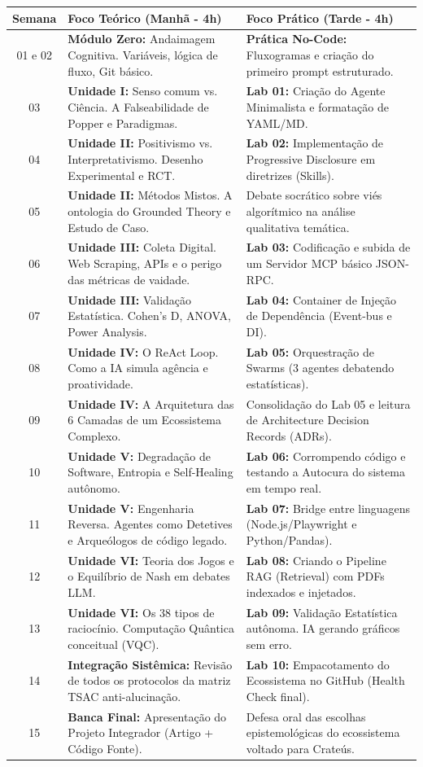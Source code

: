 \documentclass[12pt,a4paper]{article}
\begin{document}
\begin{tabularx}{\textwidth}{|c|X|X|}
\hline
\textbf{Semana} & \textbf{Foco Teórico (Manhã - 4h)} & \textbf{Foco Prático (Tarde - 4h)} \\
\hline
01 e 02 & \textbf{Módulo Zero:} Andaimagem Cognitiva. Variáveis, lógica de fluxo, Git básico. & \textbf{Prática No-Code:} Fluxogramas e criação do primeiro prompt estruturado. \\
\hline
03 & \textbf{Unidade I:} Senso comum vs. Ciência. A Falseabilidade de Popper e Paradigmas. & \textbf{Lab 01:} Criação do Agente Minimalista e formatação de YAML/MD. \\
\hline
04 & \textbf{Unidade II:} Positivismo vs. Interpretativismo. Desenho Experimental e RCT. & \textbf{Lab 02:} Implementação de Progressive Disclosure em diretrizes (Skills). \\
\hline
05 & \textbf{Unidade II:} Métodos Mistos. A ontologia do Grounded Theory e Estudo de Caso. & Debate socrático sobre viés algorítmico na análise qualitativa temática. \\
\hline
06 & \textbf{Unidade III:} Coleta Digital. Web Scraping, APIs e o perigo das métricas de vaidade. & \textbf{Lab 03:} Codificação e subida de um Servidor MCP básico JSON-RPC. \\
\hline
07 & \textbf{Unidade III:} Validação Estatística. Cohen's D, ANOVA, Power Analysis. & \textbf{Lab 04:} Container de Injeção de Dependência (Event-bus e DI). \\
\hline
08 & \textbf{Unidade IV:} O ReAct Loop. Como a IA simula agência e proatividade. & \textbf{Lab 05:} Orquestração de Swarms (3 agentes debatendo estatísticas). \\
\hline
09 & \textbf{Unidade IV:} A Arquitetura das 6 Camadas de um Ecossistema Complexo. & Consolidação do Lab 05 e leitura de Architecture Decision Records (ADRs). \\
\hline
10 & \textbf{Unidade V:} Degradação de Software, Entropia e Self-Healing autônomo. & \textbf{Lab 06:} Corrompendo código e testando a Autocura do sistema em tempo real. \\
\hline
11 & \textbf{Unidade V:} Engenharia Reversa. Agentes como Detetives e Arqueólogos de código legado. & \textbf{Lab 07:} Bridge entre linguagens (Node.js/Playwright e Python/Pandas). \\
\hline
12 & \textbf{Unidade VI:} Teoria dos Jogos e o Equilíbrio de Nash em debates LLM. & \textbf{Lab 08:} Criando o Pipeline RAG (Retrieval) com PDFs indexados e injetados. \\
\hline
13 & \textbf{Unidade VI:} Os 38 tipos de raciocínio. Computação Quântica conceitual (VQC). & \textbf{Lab 09:} Validação Estatística autônoma. IA gerando gráficos sem erro. \\
\hline
14 & \textbf{Integração Sistêmica:} Revisão de todos os protocolos da matriz TSAC anti-alucinação. & \textbf{Lab 10:} Empacotamento do Ecossistema no GitHub (Health Check final). \\
\hline
15 & \textbf{Banca Final:} Apresentação do Projeto Integrador (Artigo + Código Fonte). & Defesa oral das escolhas epistemológicas do ecossistema voltado para Crateús. \\
\hline
\end{tabularx}
\end{document}
